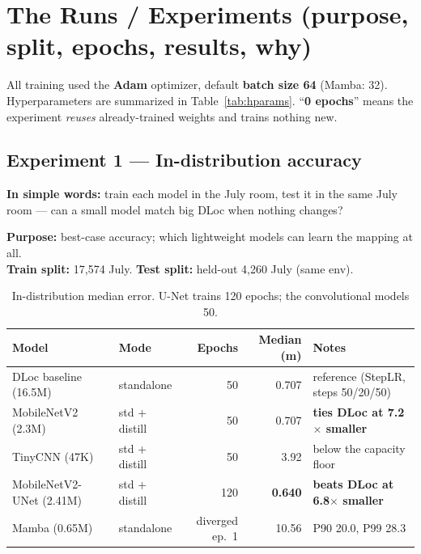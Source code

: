 \documentclass[11pt]{article}
\begin{document}
\section{The Runs / Experiments (purpose, split, epochs, results, why)}

All training used the \textbf{Adam} optimizer, default \textbf{batch size 64} (Mamba: 32). Hyperparameters
are summarized in Table~\ref{tab:hparams}. ``\textbf{0 epochs}'' means the experiment \emph{reuses}
already-trained weights and trains nothing new.

\subsection{Experiment 1 --- In-distribution accuracy}
\textbf{In simple words:} train each model in the July room, test it in the same July room --- can a
small model match big DLoc when nothing changes?

\textbf{Purpose:} best-case accuracy; which lightweight models can learn the mapping at all.\\
\textbf{Train split:} 17{,}574 July. \quad \textbf{Test split:} held-out 4{,}260 July (same env).

\begin{table}[h]
\centering
\footnotesize
\begin{tabular}{@{}llrrl@{}}
\toprule
\textbf{Model} & \textbf{Mode} & \textbf{Epochs} & \textbf{Median (m)} & \textbf{Notes} \\
\midrule
DLoc baseline (16.5M) & standalone & 50 & 0.707 & reference (StepLR, steps 50/20/50) \\
MobileNetV2 (2.3M)    & std + distill & 50 & 0.707 & \textbf{ties DLoc at 7.2$\times$ smaller} \\
TinyCNN (47K)         & std + distill & 50 & 3.92 & below the capacity floor \\
MobileNetV2-UNet (2.41M) & std + distill & 120 & \textbf{0.640} & \textbf{beats DLoc at 6.8$\times$ smaller} \\
Mamba (0.65M)         & standalone & diverged ep.\ 1 & 10.56 & P90 20.0, P99 28.3 \\
\bottomrule
\end{tabular}
\caption{In-distribution median error. U-Net trains 120 epochs; the convolutional models 50.}
\end{table}
\end{document}
